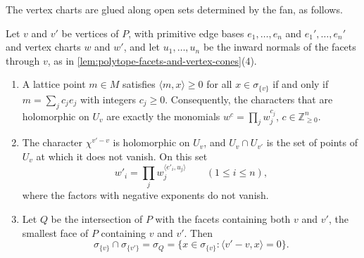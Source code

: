 The vertex charts are glued along open sets determined by the fan, as follows.

\begin{proposition}\label{prop:toric-vertex-chart-gluing}
Let $v$ and $v'$ be vertices of $P$, with primitive edge bases $e_1,\ldots,e_n$ and $e_1',\ldots,e_n'$ and vertex charts $w$ and $w'$, and let $u_1,\ldots,u_n$ be the inward normals of the facets through $v$, as in \cref{lem:polytope-facets-and-vertex-cones}(4).
\begin{enumerate}
\item A lattice point $m\in M$ satisfies $\langle m,x\rangle\geq0$ for all $x\in\sigma_{\{v\}}$ if and only if $m=\sum_jc_je_j$ with integers $c_j\geq0$. Consequently, the characters that are holomorphic on $U_v$ are exactly the monomials $w^c=\prod_jw_j^{c_j}$, $c\in\mathbb Z_{\geq0}^n$.
\item The character $\chi^{v'-v}$ is holomorphic on $U_v$, and $U_v\cap U_{v'}$ is the set of points of $U_v$ at which it does not vanish. On this set
\[
 w'_i=\prod_jw_j^{\langle e'_i,u_j\rangle}\qquad(1\leq i\leq n),
\]
where the factors with negative exponents do not vanish.
\item Let $Q$ be the intersection of $P$ with the facets containing both $v$ and $v'$, the smallest face of $P$ containing $v$ and $v'$. Then
\[
 \sigma_{\{v\}}\cap\sigma_{\{v'\}}=\sigma_Q=\{x\in\sigma_{\{v\}}:\langle v'-v,x\rangle=0\}.
\]
\end{enumerate}
\end{proposition}
